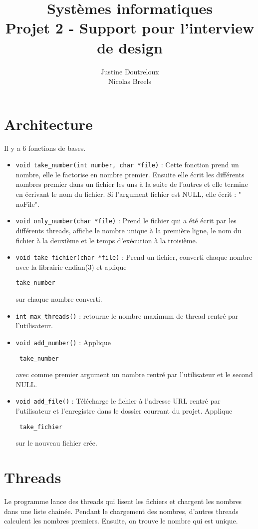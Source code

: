 \documentclass[11pt,a4paper]{article}
\author{Justine Doutreloux \\
Nicolas Breels}
\title{Systèmes informatiques\\
Projet 2 - Support pour l'interview de design}
\date{\vspace{-5ex}}
\begin{document}
\maketitle
\section{Architecture}
Il y a 6 fonctions de bases.
\begin{itemize}
\item \lstinline|void take_number(int number, char *file)| : Cette fonction prend un nombre, elle le factorise en nombre premier. Ensuite elle écrit les différents nombres premier dans un fichier les uns à la suite de l'autres et elle termine en écrivant le nom du fichier. Si l'argument fichier est NULL, elle écrit : " noFile".

\item \lstinline|void only_number(char *file)| : Prend le fichier qui a été écrit par les différents threads, affiche le nombre unique à la première ligne, le nom du fichier à la deuxième et le temps d'exécution à la troisième.

\item \lstinline|void take_fichier(char *file)| : Prend un fichier, converti chaque nombre avec la librairie endian(3) et aplique \begin{verbatim}take_number \end{verbatim} sur chaque nombre converti.

\item \lstinline|int max_threads()| : retourne le nombre maximum de thread rentré par l'utilisateur.

\item \lstinline|void add_number()| : Applique \begin{verbatim} take_number \end{verbatim} avec comme premier argument un nombre rentré par l'utilisateur et le second NULL.

\item \lstinline|void add_file()| : Télécharge le fichier à l'adresse URL rentré par l'utilisateur et l'enregistre dans le dossier courrant du projet. Applique \begin{verbatim} take_fichier \end{verbatim} sur le nouveau fichier crée.
\end{itemize}
\section{Threads}
Le programme lance des threads qui lisent les fichiers et chargent les nombres dans une liste chainée. Pendant le chargement des nombres, d'autres threads calculent les nombres premiers. Ensuite, on trouve le nombre qui est unique.
\end{document}
